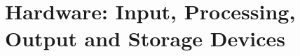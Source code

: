 \documentclass[\main/notes.tex]{subfiles}
\begin{document}
	\setcounter{chapter}{2}
	\chapter[Hardware]{Hardware: Input, Processing, Output and Storage Devices}
	\vbox{}
\end{document}
